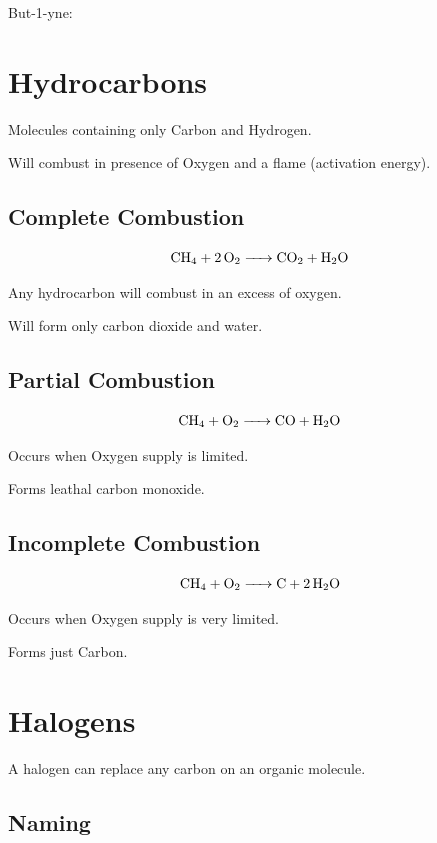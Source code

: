 \documentclass[a4paper,11pt]{article}
\begin{document}
But-1-yne:

\begin{center}
\end{center}




\section{Hydrocarbons}

Molecules containing only Carbon and Hydrogen.

Will combust in presence of Oxygen and a flame (activation energy).


\subsection{Complete Combustion}

$$
\ce{CH4 + 2O2 -> CO2 + H2O}
$$

Any hydrocarbon will combust in an excess of oxygen.

Will form only carbon dioxide and water.


\subsection{Partial Combustion}

$$
\ce{CH4 + O2 -> CO + H2O}
$$

Occurs when Oxygen supply is limited.

Forms leathal carbon monoxide.


\subsection{Incomplete Combustion}

$$
\ce{CH4 + O2 -> C + 2H2O}
$$

Occurs when Oxygen supply is very limited.

Forms just Carbon.




\section{Halogens}

A halogen can replace any carbon on an organic molecule.


\subsection{Naming}
\end{document}
